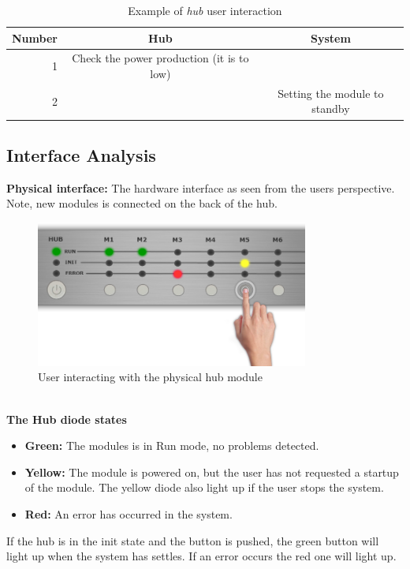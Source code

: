		\begin{table}[H]
					\begin{tabular}{| r | c | c |}
					\hline
					Number	& Hub				& System \\ \hline
					1		& Check the power production (it is to low)	& ~ \\ \hline
					2		& ~											& Setting the module to standby \\ \hline
					\end{tabular}
					\caption{Example of \textit{hub} user interaction}
				\end{table}	
	\subsection{Interface Analysis}
	\textbf{Physical interface: } The hardware interface as seen from the users perspective. Note, new modules is connected on the back of the hub.
		\begin{figure}[H]
			\begin{centering}
				 \includegraphics[width=0.8\textwidth]{images/hub_user_interact.png}
				\caption{User interacting with the physical hub module}
		 	\end{centering}
		\end{figure}
		\textbf{ } \\ 
		\textbf{The Hub diode states}
		\begin{itemize}
			\item \textbf{Green: }The modules is in Run mode, no problems detected.
			\item \textbf{Yellow: }The module is powered on, but the user has not requested a startup of the module.
							The yellow diode also light up if the user stops the system.
			\item \textbf{Red: }An error has occurred in the system.
		\end{itemize}
		If the hub is in the init state and the button is pushed, the green button will light up when the system has settles. If an error occurs the red one will light up.

